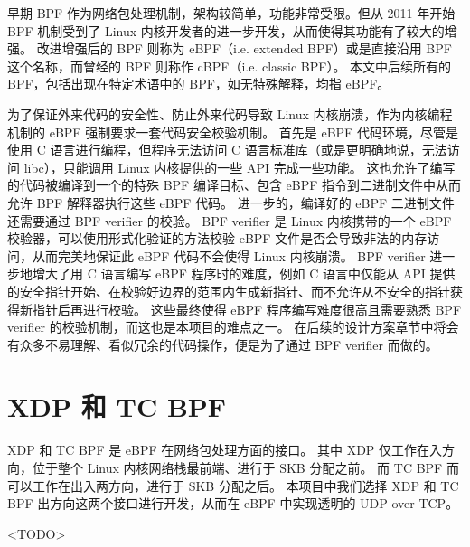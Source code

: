 早期 BPF 作为网络包处理机制，架构较简单，功能非常受限。但从 2011 年开始 BPF 机制受到了 Linux 内核开发者的进一步开发，从而使得其功能有了较大的增强。
改进增强后的 BPF 则称为 eBPF（i.e. extended BPF）或是直接沿用 BPF 这个名称，而曾经的 BPF 则称作 cBPF（i.e. classic BPF）。\cite{10.1145/3371038}
本文中后续所有的 BPF，包括出现在特定术语中的 BPF，如无特殊解释，均指 eBPF。

为了保证外来代码的安全性、防止外来代码导致 Linux 内核崩溃，作为内核编程机制的 eBPF 强制要求一套代码安全校验机制。
首先是 eBPF 代码环境，尽管是使用 C 语言进行编程，但程序无法访问 C 语言标准库（或是更明确地说，无法访问 libc），只能调用 Linux 内核提供的一些 API 完成一些功能。
这也允许了编写的代码被编译到一个的特殊 BPF 编译目标、包含 eBPF 指令到二进制文件中从而允许 BPF 解释器执行这些 eBPF 代码。
进一步的，编译好的 eBPF 二进制文件还需要通过 BPF verifier 的校验。
BPF verifier 是 Linux 内核携带的一个 eBPF 校验器，可以使用形式化验证的方法校验 eBPF 文件是否会导致非法的内存访问，从而完美地保证此 eBPF 代码不会使得 Linux 内核崩溃。
BPF verifier 进一步地增大了用 C 语言编写 eBPF 程序时的难度，例如 C 语言中仅能从 API 提供的安全指针开始、在校验好边界的范围内生成新指针、而不允许从不安全的指针获得新指针后再进行校验。
这些最终使得 eBPF 程序编写难度很高且需要熟悉 BPF verifier 的校验机制，而这也是本项目的难点之一。
在后续的设计方案章节中将会有众多不易理解、看似冗余的代码操作，便是为了通过 BPF verifier 而做的。

\section{XDP 和 TC BPF}

XDP 和 TC BPF 是 eBPF 在网络包处理方面的接口。
其中 XDP 仅工作在入方向，位于整个 Linux 内核网络栈最前端、进行于 SKB 分配之前。
而 TC BPF 而可以工作在出入两方向，进行于 SKB 分配之后。
本项目中我们选择 XDP 和 TC BPF 出方向这两个接口进行开发，从而在 eBPF 中实现透明的 UDP over TCP。

<TODO>
